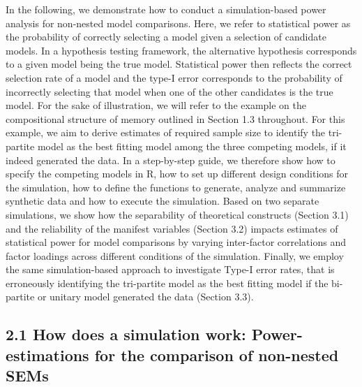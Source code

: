 \documentclass[
  man,floatsintext]{apa6}
\begin{document}
In the following, we demonstrate how to conduct a simulation-based power analysis for non-nested model comparisons. Here, we refer to statistical power as the probability of correctly selecting a model given a selection of candidate models. In a hypothesis testing framework, the alternative hypothesis corresponds to a given model being the true model. Statistical power then reflects the correct selection rate of a model and the type-I error corresponds to the probability of incorrectly selecting that model when one of the other candidates is the true model. For the sake of illustration, we will refer to the example on the compositional structure of memory outlined in Section 1.3 throughout. For this example, we aim to derive estimates of required sample size to identify the tri-partite model as the best fitting model among the three competing models, if it indeed generated the data. In a step-by-step guide, we therefore show how to specify the competing models in R, how to set up different design conditions for the simulation, how to define the functions to generate, analyze and summarize synthetic data and how to execute the simulation. Based on two separate simulations, we show how the separability of theoretical constructs (Section 3.1) and the reliability of the manifest variables (Section 3.2) impacts estimates of statistical power for model comparisons by varying inter-factor correlations and factor loadings across different conditions of the simulation. Finally, we employ the same simulation-based approach to investigate Type-I error rates, that is erroneously identifying the tri-partite model as the best fitting model if the bi-partite or unitary model generated the data (Section 3.3).

\hypertarget{how-does-a-simulation-work-power-estimations-for-the-comparison-of-non-nested-sems}{%
\subsection{2.1 How does a simulation work: Power-estimations for the comparison of non-nested SEMs}\label{how-does-a-simulation-work-power-estimations-for-the-comparison-of-non-nested-sems}}
\end{document}
